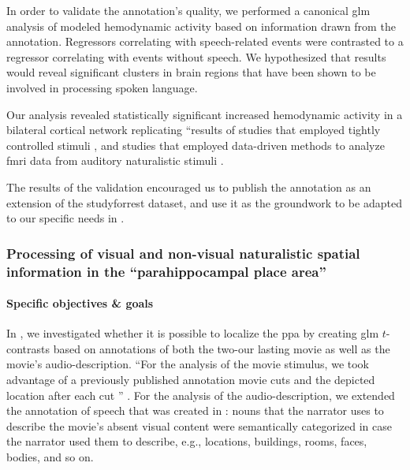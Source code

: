 In order to validate the annotation's quality, we performed a canonical \ac{glm}
analysis of modeled hemodynamic activity based on information drawn from the
annotation.
Regressors correlating with speech-related events were contrasted to a regressor
correlating with events without speech.
We hypothesized that results would reveal significant clusters in brain regions
that have been shown to be involved in processing spoken language.



Our analysis revealed statistically significant increased hemodynamic activity
in a bilateral cortical network replicating ``results of studies that employed
tightly controlled stimuli \citep[s.][for reviews]{friederici2011brain,
hickok2007cortical,price2012twentyyears}, and studies that employed data-driven
methods to analyze \ac{fmri} data from auditory naturalistic stimuli
\citep{honey2012not, lerner2011topographic, silbert2014coupled}.

The results of the validation encouraged us to publish the annotation as an
extension of the studyforrest dataset, and use it as the groundwork to be
adapted to our specific needs in \citet{haeusler2022processing}.



\subsubsection{Processing of visual and non-visual naturalistic spatial
information in the ``parahippocampal place area''}




\paragraph{Specific objectives \& goals}

In \citet{haeusler2022processing}, we investigated whether it is possible to
localize the \ac{ppa} by creating \ac{glm} $t$-contrasts based on annotations of
both the two-our lasting movie as well as the movie's audio-description.
``For the analysis of the movie stimulus, we took advantage of a previously
published annotation movie cuts and the depicted location after each cut
\citep{haeusler2016cutanno}'' \citep{haeusler2022processing}.
For the analysis of the audio-description, we extended the annotation of speech
that was created in \citet{haeusler2021speechanno}:
%
nouns that the narrator uses to describe the movie's absent visual content were
semantically categorized in case the narrator used them to describe, e.g.,
locations, buildings, rooms, faces, bodies, and so on.


